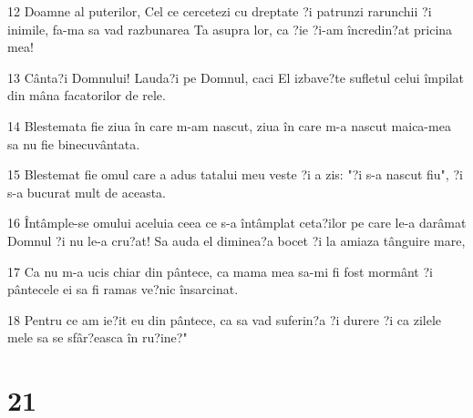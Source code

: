 \par 12 Doamne al puterilor, Cel ce cercetezi cu dreptate ?i patrunzi rarunchii ?i inimile, fa-ma sa vad razbunarea Ta asupra lor, ca ?ie ?i-am încredin?at pricina mea!
\par 13 Cânta?i Domnului! Lauda?i pe Domnul, caci El izbave?te sufletul celui împilat din mâna facatorilor de rele.
\par 14 Blestemata fie ziua în care m-am nascut, ziua în care m-a nascut maica-mea sa nu fie binecuvântata.
\par 15 Blestemat fie omul care a adus tatalui meu veste ?i a zis: "?i s-a nascut fiu", ?i s-a bucurat mult de aceasta.
\par 16 Întâmple-se omului aceluia ceea ce s-a întâmplat ceta?ilor pe care le-a darâmat Domnul ?i nu le-a cru?at! Sa auda el diminea?a bocet ?i la amiaza tânguire mare,
\par 17 Ca nu m-a ucis chiar din pântece, ca mama mea sa-mi fi fost mormânt ?i pântecele ei sa fi ramas ve?nic însarcinat.
\par 18 Pentru ce am ie?it eu din pântece, ca sa vad suferin?a ?i durere ?i ca zilele mele sa se sfâr?easca în ru?ine?"

\chapter{21}

